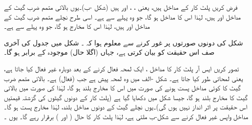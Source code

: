فرض کریں پلٹ کار کے مداخل  ہیں، یعنی ، ،  اور  ہیں (شکل -ب)۔یوں بالائی متمم ضرب گیٹ کے مداخل  اور  ہیں، لہٰذا اس کا مداخل  ہو گا، جو وہ پہلے سے ہے۔ اسی طرح نچلے متمم ضرب گیٹ کے مداخل  اور  ہیں، لہٰذا اس کا مخارج  ہو گا، جو وہ پہلے سے ہے۔

 شکل  کی دونوں صورتوں پر غور کرنے سے معلوم ہوا کہ ۔ شکل  میں جدول کی آخری صف اس حقیقت کو بیان کرتی ہے، جہاں (اگلا حال)  موجودہ  کے برابر ہو گا۔

 
تصور کریں ایس آر پلٹ کار کا مداخل ، ایک لمحہ فعال کرنے کے بعد دوبارہ غیر فعال کیا جاتا ہے، یعنی لمحاتی طور  کیا جاتا ہے۔ شکل -الف میں وہ لمحہ پیش ہے جب  (فعال) ہے۔ بالائی متمم ضرب گیٹ کا کوئی مداخل پست ہونے کی صورت میں اس کا مخارج بلند ہو گا، لہٰذا  کی صورت میں بالائی گیٹ کا مخارج بلند ہو گا، جیسا شکل میں دکھایا گیا ہے (پلٹ کار کے دونوں گیٹوں کی گزشتہ قیمتیں اس حقیقت پر اثر انداز نہیں ہوں گی)۔یوں نچلے گیٹ کے دونوں مداخل بلند، لہٰذا مخارج پست  ہو گا۔ مداخل واپس غیر فعال  کرنے سے شکل-ب ملتی ہے، لہٰذا پلٹ کار کا حال ( اور ) برقرار رہے گا۔ یوں ۔

